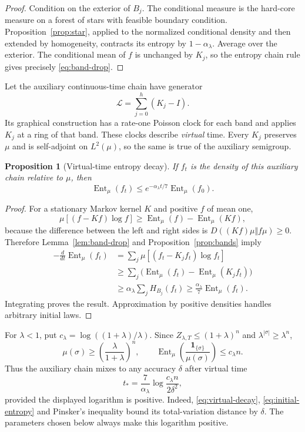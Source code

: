 \documentclass[11pt,reqno]{amsart}
\newtheorem{proposition}[theorem]{Proposition}
\theoremstyle{remark}
\newcommand{\one}{\mathbf 1}
\DeclareMathOperator{\Ent}{Ent}
\numberwithin{equation}{section}
\begin{document}
\begin{proof}
Condition on the exterior of $B_j$. The conditional measure is the hard-core measure on a forest of stars with feasible boundary condition. Proposition~\ref{prop:star}, applied to the normalized conditional density and then extended by homogeneity, contracts its entropy by $1-\alpha_\lambda$. Average over the exterior. The conditional mean of $f$ is unchanged by $K_j$, so the entropy chain rule gives precisely \eqref{eq:band-drop}.
\end{proof}

Let the auxiliary continuous-time chain have generator
\[
 \mathscr L=\sum_{j=0}^h(K_j-I).
\]
Its graphical construction has a rate-one Poisson clock for each band and applies $K_j$ at a ring of that band. These clocks describe \emph{virtual} time. Every $K_j$ preserves $\mu$ and is self-adjoint on $L^2(\mu)$, so the same is true of the auxiliary semigroup.

\begin{proposition}[Virtual-time entropy decay]\label{prop:virtual}
If $f_t$ is the density of this auxiliary chain relative to $\mu$, then
\begin{equation}\label{eq:virtual-decay}
 \Ent_\mu(f_t)\le e^{-\alpha_\lambda t/7}\Ent_\mu(f_0).
\end{equation}
\end{proposition}

\begin{proof}
For a stationary Markov kernel $K$ and positive $f$ of mean one,
\[
 \mu[(f-Kf)\log f]\ge\Ent_\mu(f)-\Ent_\mu(Kf),
\]
because the difference between the left and right sides is $D((Kf)\mu\Vert f\mu)\ge0$. Therefore Lemma~\ref{lem:band-drop} and Proposition~\ref{prop:bands} imply
\begin{align*}
 -\frac{d}{dt}\Ent_\mu(f_t)
 &=\sum_j\mu[(f_t-K_jf_t)\log f_t]\\
 &\ge\sum_j\bigl(\Ent_\mu(f_t)-\Ent_\mu(K_jf_t)\bigr)\\
 &\ge\alpha_\lambda\sum_jH_{B_j}(f_t)
 \ge\frac{\alpha_\lambda}{7}\Ent_\mu(f_t).
\end{align*}
Integrating proves the result. Approximation by positive densities handles arbitrary initial laws.
\end{proof}

For $\lambda<1$, put $c_\lambda=\log((1+\lambda)/\lambda)$. Since $Z_{\lambda,T}\le(1+\lambda)^n$ and $\lambda^{|\sigma|}\ge\lambda^n$,
\begin{equation}\label{eq:initial-entropy}
 \mu(\sigma)\ge\left(\frac\lambda{1+\lambda}\right)^n,
 \qquad \Ent_\mu\left(\frac{\one_{\{\sigma\}}}{\mu(\sigma)}\right)
 \le c_\lambda n.
\end{equation}
Thus the auxiliary chain mixes to any accuracy $\delta$ after virtual time
\begin{equation}\label{eq:tstar}
 t_* =\frac7{\alpha_\lambda}\log\frac{c_\lambda n}{2\delta^2},
\end{equation}
provided the displayed logarithm is positive. Indeed, \eqref{eq:virtual-decay}, \eqref{eq:initial-entropy} and Pinsker's inequality bound its total-variation distance by $\delta$. The parameters chosen below always make this logarithm positive.
\end{document}
